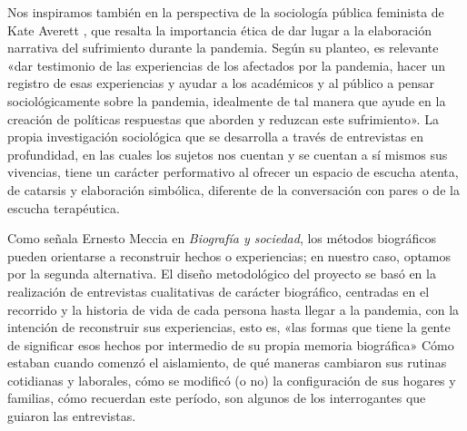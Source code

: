 \begin{refsection}
Nos inspiramos también en la perspectiva de la sociología pública feminista de Kate Averett \protect\parencite*[pág.~1]{4176-AVERETT2021}, que resalta la importancia ética de dar lugar a la elaboración narrativa del sufrimiento durante la pandemia. Según su planteo, es relevante «dar testimonio de las experiencias de los afectados por la pandemia, hacer un registro de esas experiencias y ayudar a los académicos y al público a pensar sociológicamente sobre la pandemia, idealmente de tal manera que ayude en la creación de políticas respuestas que aborden y reduzcan este sufrimiento». La propia investigación sociológica que se desarrolla a través de entrevistas en profundidad, en las cuales los sujetos nos cuentan y se cuentan a sí mismos sus vivencias, tiene un carácter performativo al ofrecer un espacio de escucha atenta, de catarsis y elaboración simbólica, diferente de la conversación con pares o de la escucha terapéutica.

Como señala Ernesto Meccia en \emph{Biografía y sociedad}, los métodos biográficos pueden orientarse a reconstruir hechos o experiencias; en nuestro caso, optamos por la segunda alternativa. El diseño metodológico del proyecto se basó en la realización de entrevistas cualitativas de carácter biográfico, centradas en el recorrido y la historia de vida de cada persona hasta llegar a la pandemia, con la intención de reconstruir sus experiencias, esto es, «las formas que tiene la gente de significar esos hechos por intermedio de su propia memoria biográfica» \protect\parencite[pág.~25]{4186-MECCIA2022} Cómo estaban cuando comenzó el aislamiento, de qué maneras cambiaron sus rutinas cotidianas y laborales, cómo se modificó (o no) la configuración de sus hogares y familias, cómo recuerdan este período, son algunos de los interrogantes que guiaron las entrevistas.


\end{refsection}

